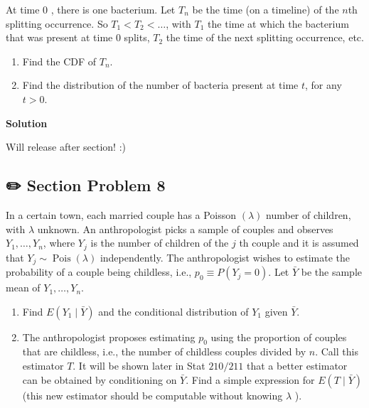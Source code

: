 \documentclass[
  letterpaper,
  DIV=11,
  numbers=noendperiod]{scrreprt}
\theoremstyle{definition}
\theoremstyle{plain}
\theoremstyle{remark}
\begin{document}
At time 0 , there is one bacterium. Let \(T_n\) be the time (on a
timeline) of the \(n\)th splitting occurrence. So \(T_1<T_2<\ldots\),
with \(T_1\) the time at which the bacterium that was present at time 0
splits, \(T_2\) the time of the next splitting occurrence, etc.

\begin{enumerate}
\def\labelenumi{(\alph{enumi})}
\item
  Find the CDF of \(T_n\).
\item
  Find the distribution of the number of bacteria present at time \(t\),
  for any \(t>0\).
\end{enumerate}

\begin{tcolorbox}[enhanced jigsaw, leftrule=.75mm, colframe=quarto-callout-tip-color-frame, colback=white, breakable, opacityback=0, left=2mm, bottomrule=.15mm, arc=.35mm, rightrule=.15mm, toprule=.15mm]
\begin{minipage}[t]{5.5mm}
\textcolor{quarto-callout-tip-color}{\faLightbulb}
\end{minipage}%
\begin{minipage}[t]{\textwidth - 5.5mm}

\textbf{Solution}\vspace{2mm}

Will release after section! :)

\end{minipage}%
\end{tcolorbox}

\hypertarget{section-problem-8}{%
\subsection*{✏️ Section Problem 8}\label{section-problem-8}}

In a certain town, each married couple has a Poisson \((\lambda)\)
number of children, with \(\lambda\) unknown. An anthropologist picks a
sample of couples and observes \(Y_1, \ldots, Y_n\), where \(Y_j\) is
the number of children of the \(j\) th couple and it is assumed that
\(Y_j \sim \operatorname{Pois}(\lambda)\) independently. The
anthropologist wishes to estimate the probability of a couple being
childless, i.e., \(p_0 \equiv P\left(Y_j=0\right)\). Let \(\bar{Y}\) be
the sample mean of \(Y_1, \ldots, Y_n\).

\begin{enumerate}
\def\labelenumi{(\alph{enumi})}
\item
  Find \(E\left(Y_1 \mid \bar{Y}\right)\) and the conditional
  distribution of \(Y_1\) given \(\bar{Y}\).
\item
  The anthropologist proposes estimating \(p_0\) using the proportion of
  couples that are childless, i.e., the number of childless couples
  divided by \(n\). Call this estimator \(T\). It will be shown later in
  Stat \(210 / 211\) that a better estimator can be obtained by
  conditioning on \(\bar{Y}\). Find a simple expression for
  \(E(T \mid \bar{Y})\) (this new estimator should be computable without
  knowing \(\lambda\) ).
\end{enumerate}
\end{document}
